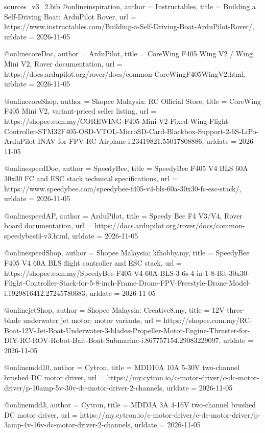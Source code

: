 \begin{filecontents*}[overwrite]{sources_v3_2.bib}
@online{inspiration,
  author = {Instructables},
  title = {Building a Self-Driving Boat: ArduPilot Rover},
  url = {https://www.instructables.com/Building-a-Self-Driving-Boat-ArduPilot-Rover/},
  urldate = {2026-11-05}
}

@online{coreDoc,
  author = {ArduPilot},
  title = {CoreWing F405 Wing V2 / Wing Mini V2, Rover documentation},
  url = {https://docs.ardupilot.org/rover/docs/common-CoreWingF405WingV2.html},
  urldate = {2026-11-05}
}

@online{coreShop,
  author = {Shopee Malaysia: RC Official Store},
  title = {CoreWing F405 Mini V2, variant-priced seller listing},
  url = {https://shopee.com.my/COREWING-F405-Mini-V2-Fixed-Wing-Flight-Controller-STM32F405-OSD-VTOL-MicroSD-Card-Blackbox-Support-2-6S-LiPo-ArduPilot-INAV-for-FPV-RC-Airplane-i.23419821.55017808886},
  urldate = {2026-11-05}
}

@online{speedDoc,
  author = {SpeedyBee},
  title = {SpeedyBee F405 V4 BLS 60A 30x30 FC and ESC stack technical specifications},
  url = {https://www.speedybee.com/speedybee-f405-v4-bls-60a-30x30-fc-esc-stack/},
  urldate = {2026-11-05}
}

@online{speedAP,
  author = {ArduPilot},
  title = {Speedy Bee F4 V3/V4, Rover board documentation},
  url = {https://docs.ardupilot.org/rover/docs/common-speedybeef4-v3.html},
  urldate = {2026-11-05}
}

@online{speedShop,
  author = {Shopee Malaysia: kfhobby.my},
  title = {SpeedyBee F405 V4 60A BLS flight controller and ESC stack},
  url = {https://shopee.com.my/SpeedyBee-F405-V4-60A-BLS-3-6s-4-in-1-8-Bit-30x30-Flight-Controller-Stack-for-5-8-inch-Frame-Drone-FPV-Freestyle-Drone-Model-i.1929816412.27245780683},
  urldate = {2026-11-05}
}

@online{jetShop,
  author = {Shopee Malaysia: Creative8.my},
  title = {12V three-blade underwater jet motor; motor variants},
  url = {https://shopee.com.my/RC-Boat-12V-Jet-Boat-Underwater-3-blades-Propeller-Motor-Engine-Thruster-for-DIY-RC-ROV-Robot-Bait-Boat-Submarine-i.867757154.29083229097},
  urldate = {2026-11-05}
}

@online{mdd10,
  author = {Cytron},
  title = {MDD10A 10A 5-30V two-channel brushed DC motor driver},
  url = {https://my.cytron.io/c-motor-driver/c-dc-motor-driver/p-10amp-5v-30v-dc-motor-driver-2-channels},
  urldate = {2026-11-05}
}

@online{mdd3,
  author = {Cytron},
  title = {MDD3A 3A 4-16V two-channel brushed DC motor driver},
  url = {https://my.cytron.io/c-motor-driver/c-dc-motor-driver/p-3amp-4v-16v-dc-motor-driver-2-channels},
  urldate = {2026-11-05}
}


\end{filecontents*}
